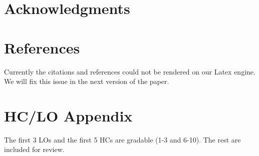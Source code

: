 \documentclass{article}
\begin{document}
\section*{Acknowledgments}
\section*{References}
%
%
Currently the citations and references could not be rendered on our Latex engine. We will fix this issue in the next version of the paper.

\clearpage

\appendix


\section{HC/LO Appendix}
\label{sec:hclo}

The first 3 LOs and the first 5 HCs are gradable (1-3 and 6-10). The rest are included for review.
\end{document}
